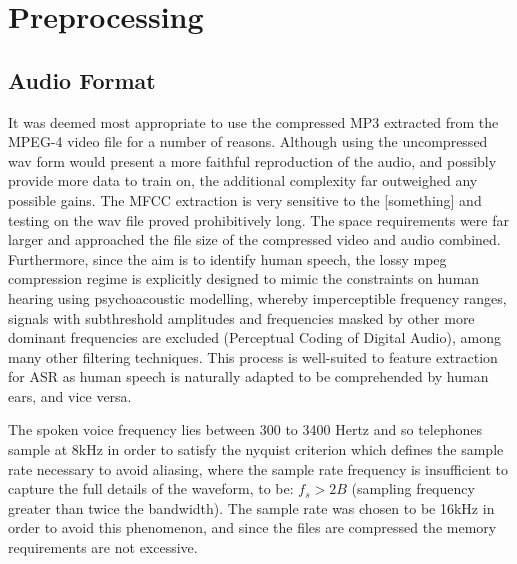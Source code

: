 
\chapter{Preprocessing} %

\label{Chapter2} %


\newcommand{\keyword}[1]{\textbf{#1}}
\newcommand{\tabhead}[1]{\textbf{#1}}
\newcommand{\code}[1]{\texttt{#1}}
\newcommand{\file}[1]{\texttt{\bfseries#1}}
\newcommand{\option}[1]{\texttt{\itshape#1}}


\section{Audio Format}
It was deemed most appropriate to use the compressed MP3 extracted from the MPEG-4 video file for a number of reasons. Although using the uncompressed wav form would present a more faithful reproduction of the audio, and possibly provide more data to train on, the additional complexity far outweighed any possible gains. The MFCC extraction is very sensitive to the [something] and testing on the wav file proved prohibitively long. The space requirements were far larger and approached the file size of the compressed video and audio combined. Furthermore, since the aim is to identify human speech, the lossy mpeg compression regime is explicitly designed to mimic the constraints on human hearing using psychoacoustic modelling, whereby imperceptible frequency ranges, signals with subthreshold amplitudes and frequencies masked by other more dominant frequencies are excluded (Perceptual Coding of Digital Audio), among many other filtering techniques. This process is well-suited to feature extraction for ASR as human speech is naturally adapted to be comprehended by human ears, and vice versa. 

The  spoken  voice  frequency  lies between  300  to  3400  Hertz\cite{Sandanalakshmi} and so telephones sample at 8kHz in order to satisfy the nyquist criterion which defines the sample rate necessary to avoid aliasing, where the sample rate frequency is insufficient to capture the full details of the waveform, to be: $f_{s} > 2B$ (sampling frequency greater than twice the bandwidth). 
The sample rate was chosen to be 16kHz in order to avoid this phenomenon, and since the files are compressed the memory requirements are not excessive.

